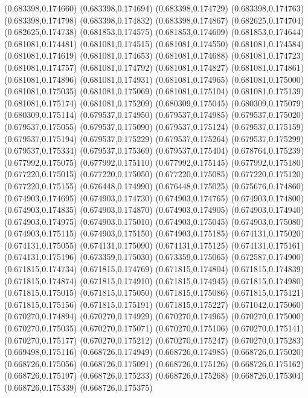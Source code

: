 (0.683398,0.174660)
(0.683398,0.174694)
(0.683398,0.174729)
(0.683398,0.174763)
(0.683398,0.174798)
(0.683398,0.174832)
(0.683398,0.174867)
(0.682625,0.174704)
(0.682625,0.174738)
(0.681853,0.174575)
(0.681853,0.174609)
(0.681853,0.174644)
(0.681081,0.174481)
(0.681081,0.174515)
(0.681081,0.174550)
(0.681081,0.174584)
(0.681081,0.174619)
(0.681081,0.174653)
(0.681081,0.174688)
(0.681081,0.174723)
(0.681081,0.174757)
(0.681081,0.174792)
(0.681081,0.174827)
(0.681081,0.174861)
(0.681081,0.174896)
(0.681081,0.174931)
(0.681081,0.174965)
(0.681081,0.175000)
(0.681081,0.175035)
(0.681081,0.175069)
(0.681081,0.175104)
(0.681081,0.175139)
(0.681081,0.175174)
(0.681081,0.175209)
(0.680309,0.175045)
(0.680309,0.175079)
(0.680309,0.175114)
(0.679537,0.174950)
(0.679537,0.174985)
(0.679537,0.175020)
(0.679537,0.175055)
(0.679537,0.175090)
(0.679537,0.175124)
(0.679537,0.175159)
(0.679537,0.175194)
(0.679537,0.175229)
(0.679537,0.175264)
(0.679537,0.175299)
(0.679537,0.175334)
(0.679537,0.175369)
(0.679537,0.175404)
(0.678764,0.175239)
(0.677992,0.175075)
(0.677992,0.175110)
(0.677992,0.175145)
(0.677992,0.175180)
(0.677220,0.175015)
(0.677220,0.175050)
(0.677220,0.175085)
(0.677220,0.175120)
(0.677220,0.175155)
(0.676448,0.174990)
(0.676448,0.175025)
(0.675676,0.174860)
(0.674903,0.174695)
(0.674903,0.174730)
(0.674903,0.174765)
(0.674903,0.174800)
(0.674903,0.174835)
(0.674903,0.174870)
(0.674903,0.174905)
(0.674903,0.174940)
(0.674903,0.174975)
(0.674903,0.175010)
(0.674903,0.175045)
(0.674903,0.175080)
(0.674903,0.175115)
(0.674903,0.175150)
(0.674903,0.175185)
(0.674131,0.175020)
(0.674131,0.175055)
(0.674131,0.175090)
(0.674131,0.175125)
(0.674131,0.175161)
(0.674131,0.175196)
(0.673359,0.175030)
(0.673359,0.175065)
(0.672587,0.174900)
(0.671815,0.174734)
(0.671815,0.174769)
(0.671815,0.174804)
(0.671815,0.174839)
(0.671815,0.174874)
(0.671815,0.174910)
(0.671815,0.174945)
(0.671815,0.174980)
(0.671815,0.175015)
(0.671815,0.175050)
(0.671815,0.175086)
(0.671815,0.175121)
(0.671815,0.175156)
(0.671815,0.175191)
(0.671815,0.175227)
(0.671042,0.175060)
(0.670270,0.174894)
(0.670270,0.174929)
(0.670270,0.174965)
(0.670270,0.175000)
(0.670270,0.175035)
(0.670270,0.175071)
(0.670270,0.175106)
(0.670270,0.175141)
(0.670270,0.175177)
(0.670270,0.175212)
(0.670270,0.175247)
(0.670270,0.175283)
(0.669498,0.175116)
(0.668726,0.174949)
(0.668726,0.174985)
(0.668726,0.175020)
(0.668726,0.175056)
(0.668726,0.175091)
(0.668726,0.175126)
(0.668726,0.175162)
(0.668726,0.175197)
(0.668726,0.175233)
(0.668726,0.175268)
(0.668726,0.175304)
(0.668726,0.175339)
(0.668726,0.175375)
